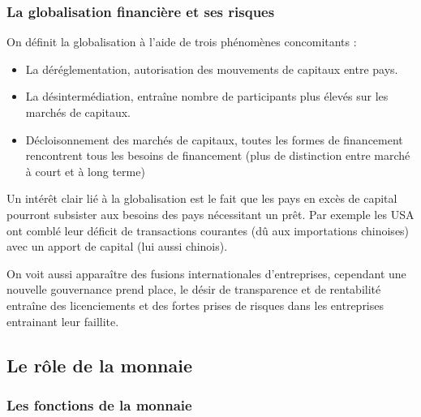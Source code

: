 
\subsubsection{La globalisation financière et ses risques} %
\label{sub:la_globalisation_financiere_et_ses_risques}

On définit la globalisation à l'aide de trois phénomènes concomitants : 
\begin{itemize}[label=]
	\item La déréglementation, autorisation des mouvements de capitaux entre pays.
	\item La désintermédiation, entraîne nombre de participants plus élevés sur les marchés de capitaux.
	\item Décloisonnement des marchés de capitaux, toutes les formes de financement rencontrent tous les besoins de financement (plus de distinction entre
	marché à court et à long terme) 
\end{itemize}

Un intérêt clair lié à la globalisation est le fait que les pays en excès de capital pourront subsister aux besoins des pays nécessitant un prêt. Par 
exemple les USA ont comblé leur déficit de transactions courantes (dû aux importations chinoises) avec un apport de capital (lui aussi chinois).

On voit aussi apparaître des fusions internationales d'entreprises, cependant une nouvelle gouvernance prend place, le désir de transparence et de rentabilité entraîne des licenciements et des fortes prises de risques dans les entreprises entrainant leur faillite.




\subsection{Le rôle de la monnaie} %
\label{sec:le_role_de_la_monnaie}

\subsubsection{Les fonctions de la monnaie} %
\label{sub:les_fonctions_de_la_monnaie}

